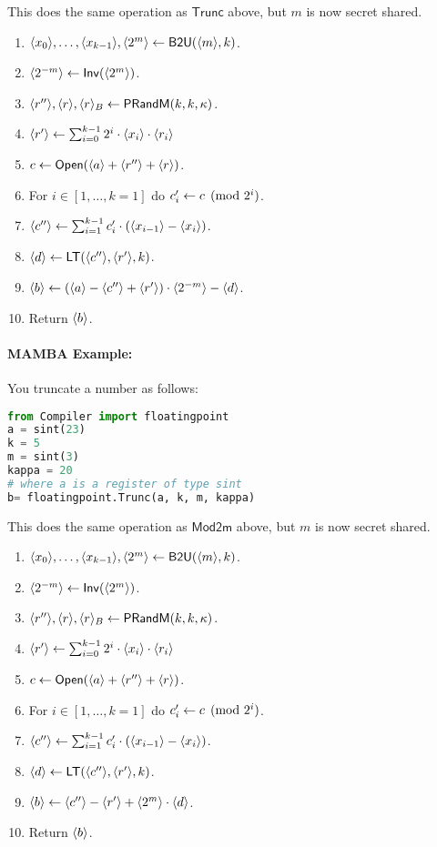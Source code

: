 This does the same operation as $\mathsf{Trunc}$ above, but $m$ is now secret shared.
\begin{enumerate}
\item $\langle x_0 \rangle,\ldots,\langle x_{k-1} \rangle, \langle 2^m \rangle \leftarrow \mathsf{B2U}(\langle m \rangle,k)$.
\item $\langle 2^{-m} \rangle \leftarrow \mathsf{Inv}(\langle 2^m \rangle)$.
\item $\langle r'' \rangle, \langle r \rangle, \langle r \rangle_B \leftarrow \mathsf{PRandM}(k,k,\kappa)$.
\item $\langle r' \rangle \leftarrow \sum_{i=0}^{k-1} 2^i \cdot \langle x_i \rangle \cdot \langle r_i \rangle$
\item $c \leftarrow {\mathsf{Open}}(\langle a \rangle+\langle r'' \rangle+\langle r \rangle)$.
\item For $i \in [1,\ldots,k=1]$ do $c_i' \leftarrow c \pmod{2^i}$.
\item $\langle c'' \rangle \leftarrow \sum_{i=1}^{k-1} c_i' \cdot (\langle x_{i-1} \rangle-\langle x_i \rangle)$.
\item $\langle d \rangle \leftarrow \mathsf{LT}(\langle c'' \rangle,\langle r' \rangle,k)$.
\item $\langle b \rangle \leftarrow (\langle a \rangle-\langle c'' \rangle+\langle r' \rangle) \cdot \langle 2^{-m} \rangle - \langle d \rangle$.
\item Return $\langle b \rangle$.
\end{enumerate}

\paragraph{MAMBA Example:} You truncate a number as follows: 
\begin{lstlisting}[language={python}]
from Compiler import floatingpoint
a = sint(23)
k = 5
m = sint(3)
kappa = 20
# where a is a register of type sint
b= floatingpoint.Trunc(a, k, m, kappa)
\end{lstlisting}


This does the same operation as $\mathsf{Mod2m}$ above, but $m$ is now secret shared.
\begin{enumerate}
\item $\langle x_0 \rangle,\ldots,\langle x_{k-1} \rangle, \langle 2^m \rangle \leftarrow \mathsf{B2U}(\langle m \rangle,k)$.
\item $\langle 2^{-m} \rangle \leftarrow \mathsf{Inv}(\langle 2^m \rangle)$.
\item $\langle r'' \rangle, \langle r \rangle, \langle r \rangle_B \leftarrow \mathsf{PRandM}(k,k,\kappa)$.
\item $\langle r' \rangle \leftarrow \sum_{i=0}^{k-1} 2^i \cdot \langle x_i \rangle \cdot \langle r_i \rangle$
\item $c \leftarrow {\mathsf{Open}}(\langle a \rangle+\langle r'' \rangle+\langle r \rangle)$.
\item For $i \in [1,\ldots,k=1]$ do $c_i' \leftarrow c \pmod{2^i}$.
\item $\langle c'' \rangle \leftarrow \sum_{i=1}^{k-1} c_i' \cdot (\langle x_{i-1} \rangle-\langle x_i \rangle)$.
\item $\langle d \rangle \leftarrow \mathsf{LT}(\langle c'' \rangle,\langle r' \rangle,k)$.
\item $\langle b \rangle \leftarrow \langle c'' \rangle-\langle r' \rangle+\langle 2^m \rangle \cdot \langle d \rangle$.
\item Return $\langle b \rangle$.
\end{enumerate}

